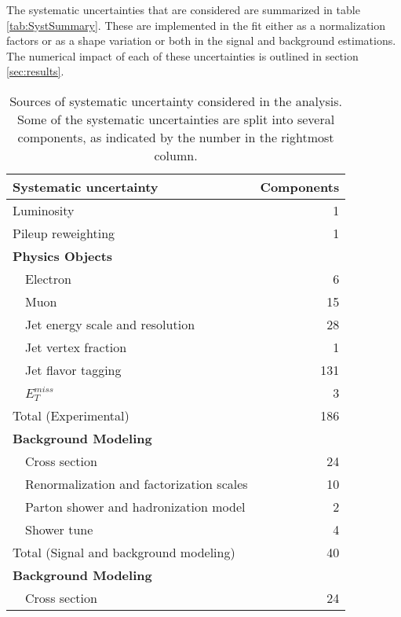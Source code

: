 The systematic uncertainties that are considered are summarized in table \ref{tab:SystSummary}. These are implemented in the fit either as a normalization factors or as a shape variation or both in the signal and background estimations. The numerical impact of each of these uncertainties is outlined in section \ref{sec:results}.

\begin{table}[h]
\centering
\caption{Sources of systematic uncertainty considered in the analysis. Some of the systematic uncertainties are split into several components, as indicated by the number in the rightmost column.}
\begin{tabular}{lr}
\hline\hline
Systematic uncertainty & Components           \\
\hline
\hline
Luminosity      & 1                   \\
Pileup reweighting      & 1                   \\
\textbf {Physics Objects}       &                     \\
\ \ Electron                                    & 6                   \\
\ \ Muon        & 15                  \\
\ \ Jet energy scale and resolution     & 28                  \\
\ \ Jet vertex fraction         & 1                   \\
\ \ Jet flavor tagging          & 131                 \\
\ \ $E^{miss}_T$        & 3                   \\
\hline
Total (Experimental)        & 186                    \\
\hline
\hline
\textbf {Background Modeling}           &                     \\
\ \ Cross section                       & 24                  \\
\ \ Renormalization and factorization scales    & 10                  \\
\ \ Parton shower and hadronization model               & 2                   \\
\ \ Shower tune                         & 4                   \\
\hline
Total (Signal and background modeling)       & 40                    \\
\hline
\hline
\textbf {Background Modeling}           &                     \\
\ \ Cross section                       & 24                  \\

\end{tabular}
\end{table}
